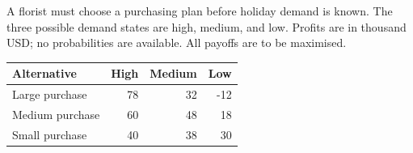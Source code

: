 \clearpage
{}
A florist must choose a purchasing plan before holiday demand is known. The three possible demand states are high, medium, and low. Profits are in thousand USD; no probabilities are available. All payoffs are to be maximised.
\begin{center}\small\setlength{\tabcolsep}{4pt}
\begin{tabular}{@{}lrrr@{}}\toprule
Alternative&High&Medium&Low\\\midrule
Large purchase&78&32&-12\\
Medium purchase&60&48&18\\
Small purchase&40&38&30\\\bottomrule
\end{tabular}\end{center}
